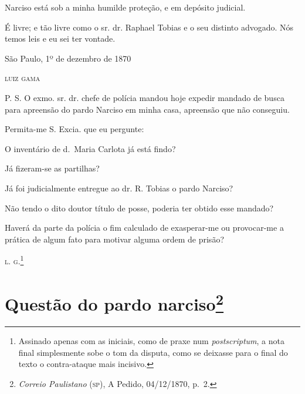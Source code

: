 Narciso está sob a minha humilde proteção, e em depósito judicial.

É livre; e tão livre como o sr. dr. Raphael Tobias e o seu distinto
advogado. Nós temos leis e eu sei ter vontade.

\begin{flushright}
São Paulo, 1º de dezembro de 1870

\textsc{luiz gama}
\end{flushright}

P. S. O exmo. sr. dr. chefe de polícia mandou hoje expedir mandado de
busca para apreensão do pardo Narciso em minha casa, apreensão que não
conseguiu.

Permita-me S. Excia. que eu pergunte:

O inventário de d.~Maria Carlota já está findo?

Já fizeram-se as partilhas?

Já foi judicialmente entregue ao dr. R. Tobias o pardo Narciso?

Não tendo o dito doutor título de posse, poderia ter obtido esse
mandado?

Haverá da parte da polícia o fim calculado de exasperar-me ou
provocar-me a prática de algum fato para motivar alguma ordem de prisão?

\textsc{l. g.}\footnote{ Assinado apenas com as iniciais, como de praxe num
  \emph{postscriptum}, a nota final simplesmente sobe o tom da disputa,
  como se deixasse para o final do texto o contra-ataque mais incisivo.}

\chapter{Questão do pardo narciso\footnote{\emph{Correio Paulistano} (\textsc{sp}), A Pedido, 04/12/1870,
  p.~2.}} %

